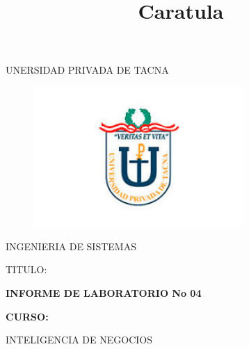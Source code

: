 \documentclass[12pt,letterpaper]{article}
\begin{document}
%


\title{Caratula}

\begin{titlepage}
\begin{center}
\large{UNERSIDAD PRIVADA DE TACNA}\\
\vspace*{-0.025in}
\begin{figure}[htb]
\begin{center}
\includegraphics[width=8cm]{imagenes/logo.jpg}
\end{center}
\end{figure}
\vspace*{0.15in}
INGENIERIA DE SISTEMAS  \\

\vspace*{0.5in}
\begin{large}
TITULO:\\
\end{large}

\vspace*{0.1in}
\begin{Large}
\textbf{INFORME DE LABORATORIO No 04} \\
\end{Large}

\vspace*{0.3in}
\begin{Large}
\textbf{CURSO:} \\
\end{Large}

\vspace*{0.1in}
\begin{large}
INTELIGENCIA DE NEGOCIOS\\
\end{large}


\end{center}
\end{titlepage}
\end{document}
